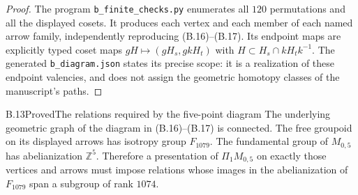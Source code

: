 \begin{proof}
The program \texttt{b\_finite\_checks.py} enumerates all $120$
permutations and all the displayed cosets.  It produces each
vertex and each member of each named arrow family, independently
reproducing (B.16)--(B.17).  Its endpoint maps are explicitly typed
coset maps $gH\mapsto(gH_s,gkH_t)$ with
$H\subset H_s\cap kH_tk^{-1}$.  The generated
\texttt{b\_diagram.json} states its precise scope: it is a
realization of these endpoint valencies, and does not assign the
geometric homotopy classes of the manuscript's paths.
\end{proof}

\begin{result}{B.13}{Proved}{The relations required by the five-point diagram}
The underlying geometric graph of the diagram in (B.16)--(B.17)
is connected.  The free groupoid on its displayed arrows has
isotropy group $F_{1079}$.  The fundamental group of $M_{0,5}$ has
abelianization $\mathbb Z^5$.  Therefore a presentation of
$\Pi_1M_{0,5}$ on exactly those vertices and arrows must impose
relations whose images in the abelianization of $F_{1079}$ span
a subgroup of rank $1074$.
\end{result}
